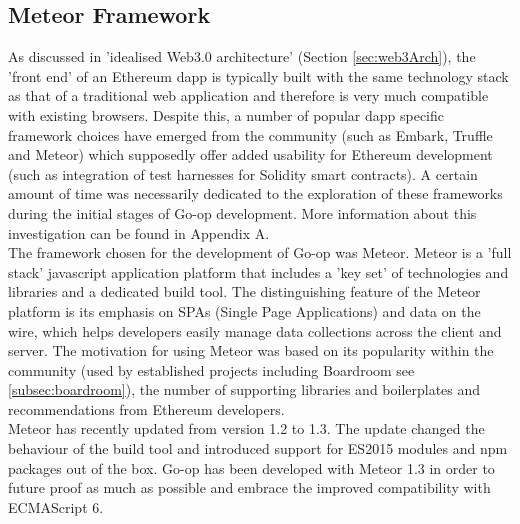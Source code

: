 \subsection{Meteor Framework}
As discussed in 'idealised Web3.0 architecture' (Section \ref{sec:web3Arch}), the 'front end' of an Ethereum dapp is typically built with the same technology stack as that of a traditional web application and therefore is very much compatible with existing browsers. Despite this, a number of popular dapp specific framework choices have emerged from the community (such as Embark\cite{Embark}, Truffle\cite{Truffle} and Meteor\cite{Meteor}) which supposedly offer added usability for Ethereum development (such as integration of test harnesses for Solidity smart contracts). A certain amount of time was necessarily dedicated to the exploration of these frameworks during the initial stages of Go-op development. More information about this investigation can be found in Appendix A.\\

The framework chosen for the development of Go-op was Meteor\cite{Meteor}. Meteor is a 'full stack' javascript application platform that includes a 'key set' of technologies and libraries and a dedicated build tool. The distinguishing feature of the Meteor platform is its emphasis on SPAs (Single Page Applications) and data on the wire, which helps developers easily manage data collections across the client and server. The motivation for using Meteor was based on its popularity within the community (used by established projects including Boardroom see \ref{subsec:boardroom}), the number of supporting libraries and boilerplates and recommendations from Ethereum developers\cite{MeteorRef}.\\

Meteor has recently updated from version 1.2 to 1.3. The update changed the behaviour of the build tool and introduced support for ES2015 modules and npm packages out of the box. Go-op has been developed with Meteor 1.3 in order to future proof as much as possible and embrace the improved compatibility with ECMAScript 6.\\

